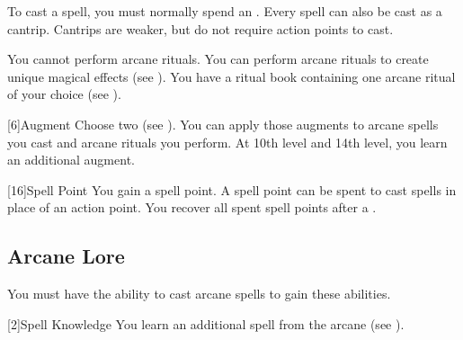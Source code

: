         To cast a spell, you must normally spend an .
        Every spell can also be cast as a cantrip.
        Cantrips are weaker, but do not require action points to cast.

         You cannot perform arcane rituals.
         You can perform arcane rituals to create unique magical effects (see ).
        You have a ritual book containing one arcane ritual of your choice (see ).

        [6]{Augment}
        Choose two  (see ).
        You can apply those augments to arcane spells you cast and arcane rituals you perform.
        At 10th level and 14th level, you learn an additional augment.

        [16]{Spell Point}
        You gain a spell point.
        A spell point can be spent to cast spells in place of an action point.
        You recover all spent spell points after a .

    \subsection{Arcane Lore}
        You must have the ability to cast arcane spells to gain these abilities.

        [2]{Spell Knowledge} 
        You learn an additional spell from the arcane  (see ).


